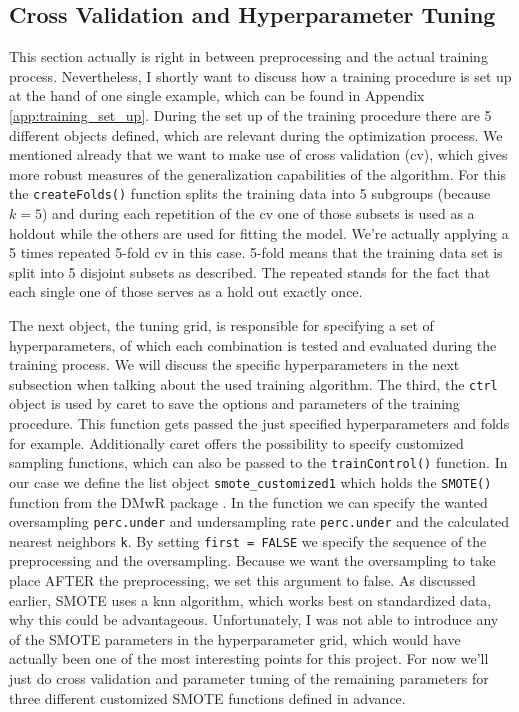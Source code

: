 \documentclass[12pt,a4paper]{article}
\begin{document}
\subsection*{Cross Validation and Hyperparameter Tuning}
This section actually is right in between preprocessing and the actual training process. Nevertheless, I shortly want to discuss how a training procedure is set up at the hand of one single example, which can be found in Appendix \vref{app:training_set_up}. During the set up of the training procedure there are 5 different objects defined, which are relevant during the optimization process. We mentioned already that we want to make use of cross validation (cv), which gives more robust measures of the generalization capabilities of the algorithm. For this the \verb+createFolds()+ function splits the training data into 5 subgroups (because $k=5$) and during each repetition of the cv one of those subsets is used as a holdout while the others are used for fitting the model. We're actually applying a 5 times repeated 5-fold cv in this case. 5-fold means that the training data set is split into 5 disjoint subsets as described. The repeated stands for the fact that each single one of those serves as a hold out exactly once.

The next object, the tuning grid, is responsible for specifying a set of hyperparameters, of which each combination is tested and evaluated during the training process. We will discuss the specific hyperparameters in the next subsection when talking about the used training algorithm. The third, the \verb+ctrl+ object is used by caret to save the options and parameters of the training procedure. This function gets passed the just specified hyperparameters and folds for example. Additionally caret offers the possibility to specify customized sampling functions, which can also be passed to the \verb+trainControl()+ function. In our case we define the list object \verb+smote_customized1+ which holds the \verb+SMOTE()+ function from the DMwR package \cite{Torgo2010}. In the function we can specify the wanted oversampling \verb+perc.under+ and undersampling rate \verb+perc.under+ and the calculated nearest neighbors \verb+k+. By setting \verb+first = FALSE+ we specify the sequence of the preprocessing and the oversampling. Because we want the oversampling to take place AFTER the preprocessing, we set this argument to false. As discussed earlier, SMOTE uses a knn algorithm, which works best on standardized data, why this could be advantageous. Unfortunately, I was not able to introduce any of the SMOTE parameters in the hyperparameter grid, which would have actually been one of the most interesting points for this project. For now we'll just do cross validation and parameter tuning of the remaining parameters for three different customized SMOTE functions defined in advance.
\end{document}
